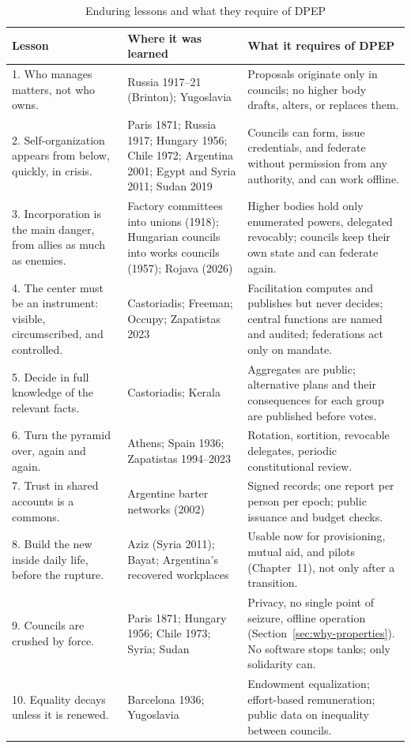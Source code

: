 \documentclass[10pt,twoside,openany]{book}
\theoremstyle{dpepstyle}
\begin{document}
\begin{table}[htbp]
\centering
\caption{Enduring lessons and what they require of DPEP}
\label{tab:enduring}
\scriptsize
\setlength{\tabcolsep}{3pt}
\begin{tabularx}{\textwidth}{L{1.15in} L{1.35in} Y}
\toprule
\textbf{Lesson} & \textbf{Where it was learned} & \textbf{What it requires of DPEP} \\
. Who manages matters, not who owns. & Russia 1917--21 (Brinton); Yugoslavia & Proposals originate only in councils; no higher body drafts, alters, or replaces them. \\
2. Self-organization appears from below, quickly, in crisis. & Paris 1871; Russia 1917; Hungary 1956; Chile 1972; Argentina 2001; Egypt and Syria 2011; Sudan 2019 & Councils can form, issue credentials, and federate without permission from any authority, and can work offline. \\
3. Incorporation is the main danger, from allies as much as enemies. & Factory committees into unions (1918); Hungarian councils into works councils (1957); Rojava (2026) & Higher bodies hold only enumerated powers, delegated revocably; councils keep their own state and can federate again. \\
4. The center must be an instrument: visible, circumscribed, and controlled. & Castoriadis; Freeman; Occupy; Zapatistas 2023 & Facilitation computes and publishes but never decides; central functions are named and audited; federations act only on mandate. \\
5. Decide in full knowledge of the relevant facts. & Castoriadis; Kerala & Aggregates are public; alternative plans and their consequences for each group are published before votes. \\
6. Turn the pyramid over, again and again. & Athens; Spain 1936; Zapatistas 1994--2023 & Rotation, sortition, revocable delegates, periodic constitutional review. \\
7. Trust in shared accounts is a commons. & Argentine barter networks (2002) & Signed records; one report per person per epoch; public issuance and budget checks. \\
8. Build the new inside daily life, before the rupture. & Aziz (Syria 2011); Bayat; Argentina's recovered workplaces & Usable now for provisioning, mutual aid, and pilots (Chapter~11), not only after a transition. \\
9. Councils are crushed by force. & Paris 1871; Hungary 1956; Chile 1973; Syria; Sudan & Privacy, no single point of seizure, offline operation (Section~\ref{sec:why-properties}). No software stops tanks; only solidarity can. \\
10. Equality decays unless it is renewed. & Barcelona 1936; Yugoslavia & Endowment equalization; effort-based remuneration; public data on inequality between councils. \\
\bottomrule
\end{tabularx}
\end{table}
\end{document}
